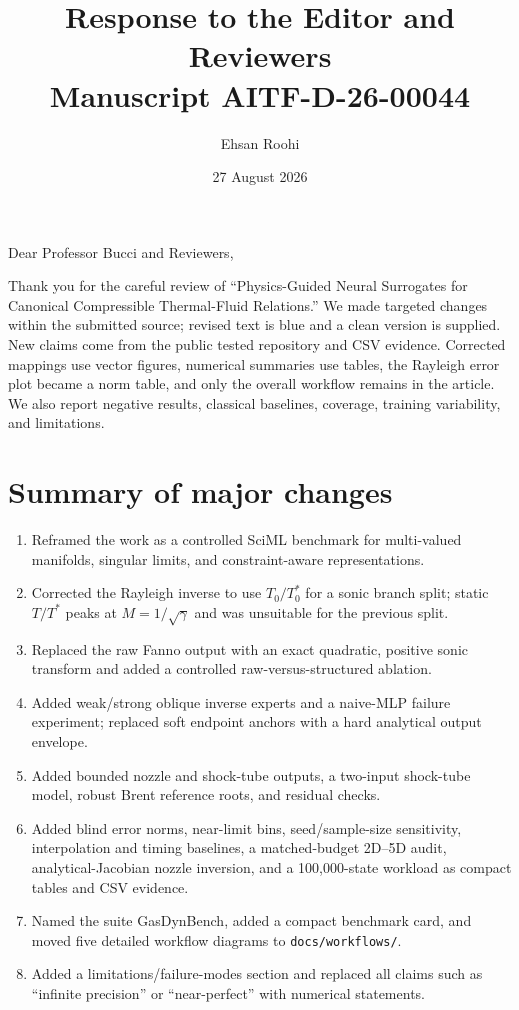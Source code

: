 \documentclass[11pt]{article}
\title{Response to the Editor and Reviewers\\\large Manuscript AITF-D-26-00044}
\author{Ehsan Roohi}
\date{27 August 2026}
\begin{document}
\maketitle

Dear Professor Bucci and Reviewers,

Thank you for the careful review of ``Physics-Guided Neural Surrogates for Canonical Compressible Thermal-Fluid Relations.'' We made targeted changes within the submitted source; revised text is blue and a clean version is supplied. New claims come from the public tested repository and CSV evidence. Corrected mappings use vector figures, numerical summaries use tables, the Rayleigh error plot became a norm table, and only the overall workflow remains in the article. We also report negative results, classical baselines, coverage, training variability, and limitations.

\section*{Summary of major changes}
\begin{enumerate}[leftmargin=*]
\item Reframed the work as a controlled SciML benchmark for multi-valued manifolds, singular limits, and constraint-aware representations.
\item Corrected the Rayleigh inverse to use $T_0/T_0^*$ for a sonic branch split; static $T/T^*$ peaks at $M=1/\sqrt{\gamma}$ and was unsuitable for the previous split.
\item Replaced the raw Fanno output with an exact quadratic, positive sonic transform and added a controlled raw-versus-structured ablation.
\item Added weak/strong oblique inverse experts and a naive-MLP failure experiment; replaced soft endpoint anchors with a hard analytical output envelope.
\item Added bounded nozzle and shock-tube outputs, a two-input shock-tube model, robust Brent reference roots, and residual checks.
\item Added blind error norms, near-limit bins, seed/sample-size sensitivity, interpolation and timing baselines, a matched-budget 2D--5D audit, analytical-Jacobian nozzle inversion, and a 100,000-state workload as compact tables and CSV evidence.
\item Named the suite GasDynBench, added a compact benchmark card, and moved five detailed workflow diagrams to \texttt{docs/workflows/}.
\item Added a limitations/failure-modes section and replaced all claims such as ``infinite precision'' or ``near-perfect'' with numerical statements.
\end{enumerate}
\end{document}
